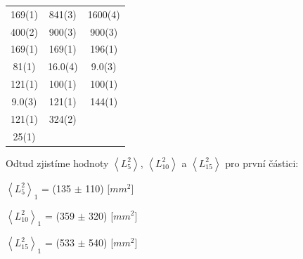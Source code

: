 \documentclass[a4paper,11pt]{article}
\begin{document}
\begin{minipage}[t]{0.5\textwidth}
\begin{tabular}{|c|c|c|}
            169(1) & 841(3) & 1600(4) \\
            400(2) & 900(3) & 900(3) \\
            169(1) & 169(1) & 196(1) \\
            81(1) & 16.0(4) & 9.0(3) \\
            121(1) & 100(1) & 100(1) \\
            9.0(3) & 121(1) & 144(1) \\
            121(1) & 324(2) &  \\
            25(1) &  &  \\
            \hline
            \end{tabular}
            \captionsetup{justification=centering, font=footnotesize}
        \vspace{15pt}
        \raggedright
        Odtud zjistíme hodnoty $\left\langle L_{5}^2\right\rangle$, $\left\langle L_{10}^2\right\rangle$ a $\left\langle L_{15}^2\right\rangle$ pro první částici: 
        \begin{center}
            $\left\langle L_{5}^2\right\rangle_1$ = (135 $\pm$ 110)  [$mm^2$]
            \vspace{5pt}
            \par $\left\langle L_{10}^2\right\rangle_1$ = (359 $\pm$ 320)  [$mm^2$]
            \vspace{5pt}
            \par $\left\langle L_{15}^2\right\rangle_1$ = (533 $\pm$ 540)  [$mm^2$]
        \end{center}
    \end{minipage}
\newpage
\end{document}
